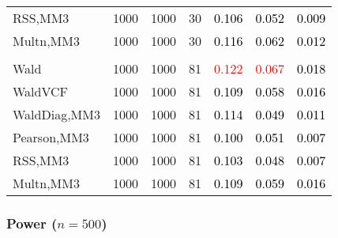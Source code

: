 \documentclass[
]{article}
\begin{document}
\begin{table}[H]
{\begin{tabular}[t]{lrrrrrr}
\hspace{1em}RSS,MM3 & 1000 & 1000 & 30 & \textcolor{black}{0.106} & \textcolor{black}{0.052} & \textcolor{black}{0.009}\\
\hspace{1em}Multn,MM3 & 1000 & 1000 & 30 & \textcolor{black}{0.116} & \textcolor{black}{0.062} & \textcolor{black}{0.012}\\
\addlinespace[0.3em]
\multicolumn{7}{l}{\textbf{3F 15V}}\\
\hspace{1em}Wald & 1000 & 1000 & 81 & \textcolor{red}{0.122} & \textcolor{red}{0.067} & \textcolor{black}{0.018}\\
\hspace{1em}WaldVCF & 1000 & 1000 & 81 & \textcolor{black}{0.109} & \textcolor{black}{0.058} & \textcolor{black}{0.016}\\
\hspace{1em}WaldDiag,MM3 & 1000 & 1000 & 81 & \textcolor{black}{0.114} & \textcolor{black}{0.049} & \textcolor{black}{0.011}\\
\hspace{1em}Pearson,MM3 & 1000 & 1000 & 81 & \textcolor{black}{0.100} & \textcolor{black}{0.051} & \textcolor{black}{0.007}\\
\hspace{1em}RSS,MM3 & 1000 & 1000 & 81 & \textcolor{black}{0.103} & \textcolor{black}{0.048} & \textcolor{black}{0.007}\\
\hspace{1em}Multn,MM3 & 1000 & 1000 & 81 & \textcolor{black}{0.109} & \textcolor{black}{0.059} & \textcolor{black}{0.016}\\
\bottomrule
\end{tabular}}
\endgroup{}
\end{table}

\subsubsection{\texorpdfstring{Power
(\(n=500\))}{Power (n=500)}}\label{power-n500-3}
\end{document}
